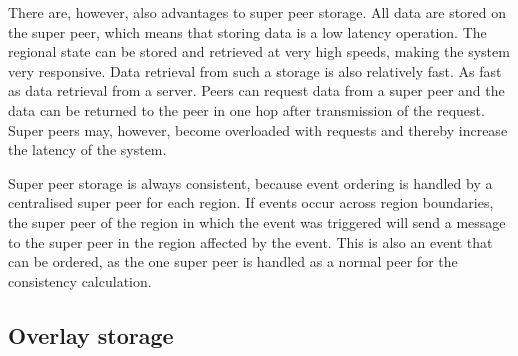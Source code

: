 \documentclass[journal,oneside,a4paper,onecolumn]{IEEEtran}
\begin{document}
There are, however, also advantages to super peer storage. All data are stored on the super peer, which means that storing data is a low latency operation. The regional state can be stored and retrieved at very high speeds, making the system very responsive. Data retrieval from such a storage is also relatively fast. As fast as data retrieval from a server. Peers can request data from a super peer and the data can be returned to the peer in one hop after transmission of the request. Super peers may, however, become overloaded with requests and thereby increase the latency of the system.

Super peer storage is always consistent, because event ordering is handled by a centralised super peer for each region. If events occur across region boundaries, the super peer of the region in which the event was triggered will send a message to the super peer in the region affected by the event. This is also an event that can be ordered, as the one super peer is handled as a normal peer for the consistency calculation.

\subsection{Overlay storage}
\label{overlay_storage}
\end{document}
